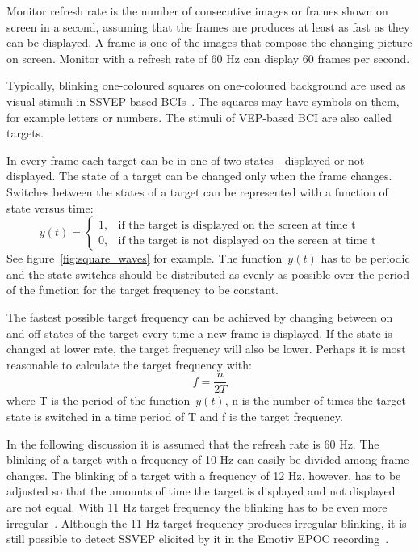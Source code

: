 Monitor refresh rate is the number of consecutive images or frames shown on screen in a second, assuming that the frames are produces at least as fast as they can be displayed. A frame is one of the images that compose the changing picture on screen. Monitor with a refresh rate of 60 Hz can display 60 frames per second. 

Typically, blinking one-coloured squares on one-coloured background are used as visual stimuli in \gls{SSVEP}-based \glspl{BCI}~\cite{ssvep_stim}. The squares may have symbols on them, for example letters or numbers. The stimuli of \gls{VEP}-based \gls{BCI} are also called targets.

In every frame each target can be in one of two states - displayed or not displayed. The state of a target can be changed only when the frame changes. Switches between the states of a target can be represented with a function of state versus time:
\begin{equation}
	\label{eq:state_vs_time}
	y(t)=
	\begin{cases}
		1,	&\mbox{if the target is displayed on the screen at time t}\\
		0,	&\mbox{if the target is not displayed on the screen at time t}
	\end{cases}
\end{equation}
See figure~\ref{fig:square_waves} for example. The function~$y(t)$ has to be periodic and the state switches should be distributed as evenly as possible over the period of the function for the target frequency to be constant.

The fastest possible target frequency can be achieved by changing between on and off states of the target every time a new frame is displayed. If the state is changed at lower rate, the target frequency will also be lower. Perhaps it is most reasonable to calculate the target frequency with:
\begin{equation}
	f = \frac{n}{2T}
\end{equation}
where T is the period of the function~$y(t)$, n is the number of times the target state is switched in a time period of T and f is the target frequency.

In the following discussion it is assumed that the refresh rate is 60 Hz. The blinking of a target with a frequency of 10 Hz can easily be divided among frame changes. The blinking of a target with a frequency of 12 Hz, however, has to be adjusted so that the amounts of time the target is displayed and not displayed are not equal. With 11 Hz target frequency the blinking has to be even more irregular~\cite{11hz}. Although the 11 Hz target frequency produces irregular blinking, it is still possible to detect \gls{SSVEP} elicited by it in the Emotiv EPOC recording~\cite{emotiv_11hz}.

